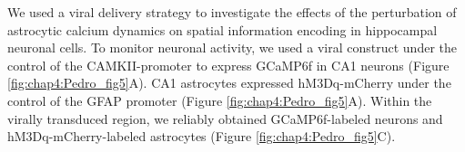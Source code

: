 We used a viral delivery strategy to investigate the effects of the perturbation of astrocytic calcium dynamics on spatial information encoding in hippocampal neuronal cells. 
To monitor neuronal activity, we used a viral construct under the control of the CAMKII-promoter to express GCaMP6f in CA1 neurons (Figure \ref{fig:chap4:Pedro_fig5}A). 
CA1 astrocytes expressed hM3Dq-mCherry under the control of the GFAP promoter (Figure \ref{fig:chap4:Pedro_fig5}A). 
Within the virally transduced region, we reliably obtained GCaMP6f-labeled neurons and hM3Dq-mCherry-labeled astrocytes (Figure \ref{fig:chap4:Pedro_fig5}C).


